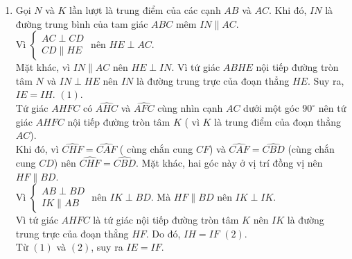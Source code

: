 \begin{bt}
{\begin{enumerate}
			Vì hai góc $EHC$ và $HCD$ ở vị trí so le trong nên $HE \parallel CD$.
			\item Gọi $N$ và $K$ lần lượt là trung điểm của các cạnh $AB$ và $AC$. Khi đó, $IN$ là đường trung bình của tam giác $ABC$ mêm $IN \parallel AC$.\\
			Vì $\begin{cases} AC \perp CD\\ CD \parallel HE	\end{cases}$ nên $HE \perp AC$.\\
			Mặt khác, vì $IN \parallel AC$ nên $HE \perp IN$.
			Vì tứ giác $ABHE$ nội tiếp đường tròn tâm $N$ và $IN \perp HE$ nên $IN$ là đường trung trực của đoạn thẳng $HE$. Suy ra, $IE=IH$. \quad $(1)$.\\
			Tứ giác $AHFC$ có $\widehat{AHC}$ và $\widehat{AFC}$ cùng nhìn cạnh $AC$ dưới một góc $90^\circ$ nên tứ giác $AHFC$ nội tiếp đường tròn tâm $K$ ( vì $K$ là trung điểm của đoạn thẳng $AC$). \\
			Khi đó, vì  $\widehat{CHF}=\widehat{CAF}$ ( cùng chắn cung $CF$) và $\widehat{CAF}=\widehat{CBD}$ (cùng chắn cung $CD$) nên $\widehat{CHF}=\widehat{CBD}$. Mặt khác, hai góc này ở vị trí đồng vị nên $HF \parallel BD$.\\
			Vì $\begin{cases} AB \perp BD	\\ IK \parallel AB		\end{cases}$ nên $IK \perp BD$. Mà $HF \parallel BD$ nên $IK \perp IK$.\\
			Vì tứ giác $AHFC$ là tứ giác nội tiếp đường tròn tâm $K$ nên $IK$ là đường trung trực của đoạn thẳng $HF$. Do đó, $IH=IF$ \quad $(2)$.\\
			Từ $(1)$ và $(2)$, suy ra $IE=IF$.
		\end{enumerate}	
	}
\end{bt}

